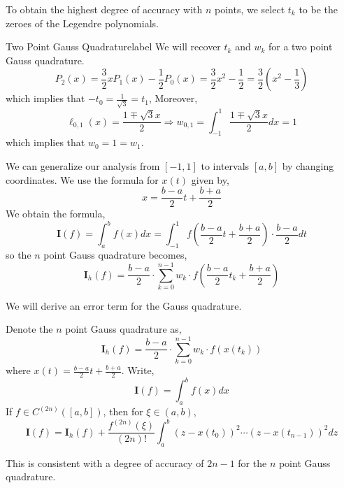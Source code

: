 \begin{marginfigure}
	To obtain the highest degree of accuracy with $n$ points, we select $t_k$ to be the zeroes of the Legendre polynomials.
\end{marginfigure}

\begin{ex}{Two Point Gauss Quadrature}{label}
	We will recover $t_k$ and $w_k$ for a two point Gauss quadrature.
	\[P_2(x)=\frac{3}{2} x P_1(x)-\frac{1}{2} P_0(x)=\frac{3}{2} x^2-\frac{1}{2}=\frac{3}{2}\left(x^2-\frac{1}{3}\right)\]
	which implies that $-t_0=\frac{1}{\sqrt{3}}=t_1$, Moreover,
	\[\ell_{0,1}(x)=\frac{1 \mp \sqrt{3} x}{2} \Rightarrow w_{0,1}=\int_{-1}^1 \frac{1 \mp \sqrt{3} x}{2} d x=1\]
	which implies that $w_0=1=w_1$.
\end{ex}

\noindent We can generalize our analysis from $[-1, 1]$ to intervals $[a, b]$ by changing coordinates. We use the formula for $x(t)$ given by,
\[x=\frac{b-a}{2} t+\frac{b+a}{2}\]
We obtain the formula,
\[\mathbf{I}(f)=\int_a^b f(x) d x=\int_{-1}^1 f\left(\frac{b-a}{2} t+\frac{b+a}{2}\right) \cdot \frac{b-a}{2} d t\]
so the $n$ point Gauss quadrature becomes,
\[\mathbf{I}_h(f)=\frac{b-a}{2} \cdot \sum_{k=0}^{n-1} w_k \cdot f\left(\frac{b-a}{2} t_k+\frac{b+a}{2}\right)\]

\noindent We will derive an error term for the Gauss quadrature.
\begin{thm}
	Denote the $n$ point Gauss quadrature as,
	\[\mathbf{I}_h(f) = \frac{b-a}{2} \cdot \sum_{k=0}^{n-1} w_k \cdot f\left(x\left(t_k\right)\right)\]
	where $x(t)=\frac{b-a}{2} t+\frac{b+a}{2}$. Write,
	\[\mathbf{I}(f) = \int_a^b f(x) d x\]
	If $f \in C^{(2n)}([a, b])$, then for $\xi \in (a,b)$,
	\[\mathbf{I}(f)=\mathbf{I}_h(f)+\frac{f^{(2 n)}(\xi)}{(2 n) !} \int_a^b\left(z-x\left(t_0\right)\right)^2 \cdots\left(z-x\left(t_{n-1}\right)\right)^2 d z\]
\end{thm}

\begin{marginfigure}
	This is consistent with a degree of accuracy of $2n - 1$ for the $n$ point Gauss quadrature.
\end{marginfigure}


